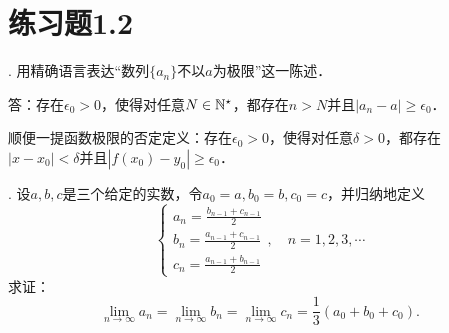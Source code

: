 \section*{练习题1.2}
. 用精确语言表达``数列$\{a_n\}$不以$a$为极限''这一陈述．

\noindent 答：存在$\epsilon_0 > 0$，使得对任意$N \in \mathbb{N}^\star$，都存在$n > N$并且$|a_n - a| \geq \epsilon_0$．

\noindent 顺便一提函数极限的否定定义：存在$\epsilon_0 > 0$，使得对任意$\delta > 0$，都存在$|x - x_0| < \delta$并且$|f(x_0) - y_0| \geq \epsilon_0$．

. 设$a,b,c$是三个给定的实数，令$a_0 = a, b_0 = b, c_0 = c$，并归纳地定义
\begin{equation}
    \begin{cases}
        a_n = \displaystyle\frac{b_{n-1}+c_{n-1}}{2} \\
        b_n = \displaystyle\frac{a_{n-1}+c_{n-1}}{2} \\
        c_n = \displaystyle\frac{a_{n-1}+b_{n-1}}{2}
    \end{cases}, \quad n = 1,2,3,\cdots
\end{equation}
求证：
\begin{equation}
    \lim_{n\to\infty} a_n = \lim_{n\to\infty} b_n = \lim_{n\to\infty} c_n = \frac{1}{3} \left( a_0+b_0+c_0 \right).
\end{equation}

